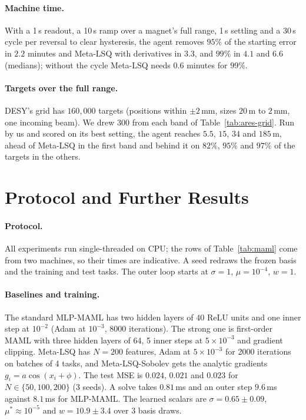\documentclass[fullpaper,final]{nldl}
\theoremstyle{plain}
\theoremstyle{definition}
\begin{document}
\paragraph{Machine time.} With a 1\,s readout, a 10\,s ramp over a magnet's full
range, 1\,s settling and a 30\,s cycle per reversal to clear hysteresis, the agent
removes $95\%$ of the starting error in $2.2$ minutes and Meta-LSQ with derivatives
in $3.3$, and $99\%$ in $4.1$ and $6.6$ (medians); without the cycle Meta-LSQ needs
$0.6$ minutes for $99\%$.

\paragraph{Targets over the full range.} DESY's grid has $160{,}000$ targets
(positions within $\pm2$\,mm, sizes $20$\,\textmu m to $2$\,mm, one incoming beam).
We drew 300 from each band of Table~\ref{tab:ares-grid}. Run by us and scored on its
best setting, the agent reaches $5.5$, $15$, $34$ and $185$\,\textmu m, ahead of
Meta-LSQ in the first band and behind it on $82\%$, $95\%$ and $97\%$ of the targets
in the others.

\section{Protocol and Further Results}
\label{app:details}

\paragraph{Protocol.} All experiments run single-threaded on CPU; the rows of
Table~\ref{tab:maml} come from two machines, so their times are indicative. A seed
redraws the frozen basis and the training and test tasks. The outer loop starts at
$\sigma{=}1$, $\mu{=}10^{-4}$, $w{=}1$.

\paragraph{Baselines and training.} The standard MLP-MAML has two hidden layers of 40
ReLU units and one inner step at $10^{-2}$ (Adam at $10^{-3}$, 8000 iterations). The
strong one is first-order MAML with three hidden layers of 64, 5 inner steps at
$5\!\times\!10^{-3}$ and gradient clipping. Meta-LSQ has $N{=}200$ features, Adam at
$5\!\times\!10^{-3}$ for 2000 iterations on batches of 4 tasks, and
Meta-LSQ-Sobolev gets the analytic gradients $g_i = a\cos(x_i+\phi)$. The test MSE
is $0.024$, $0.021$ and $0.023$ for $N \in \{50,100,200\}$ (3 seeds). A solve takes $0.81$\,ms
and an outer step $9.6$\,ms against $8.1$\,ms for MLP-MAML. The learned scalars are
$\sigma = 0.65 \pm 0.09$, $\mu^\ast \approx 10^{-5}$ and $w = 10.9 \pm 3.4$ over
3 basis draws.
\end{document}
